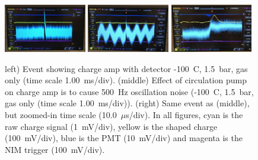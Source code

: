  \begin{figure}[htbp]
\begin{center}
\includegraphics[width = 0.32\textwidth, keepaspectratio]{figures/testbed/circ_off.png}
\includegraphics[width = 0.32\textwidth, keepaspectratio]{figures/testbed/circ_noise.png}
\includegraphics[width = 0.32\textwidth, keepaspectratio]{figures/testbed/circ_noise_zoom.png}
\caption{left) Event showing charge amp with detector -100~C, 1.5~bar, gas only (time scale 1.00~ms/div). (middle) Effect of circulation pump on charge amp is to cause 500~Hz oscillation noise (-100~C, 1.5~bar, gas only (time scale 1.00~ms/div)). (right) Same event as (middle), but zoomed-in time scale (10.0~$\mu$s/div). In all figures, cyan is the raw charge signal (1~mV/div), yellow is the shaped charge (100~mV/div), blue is the \acs{PMT} (10~mV/div) and magenta is the \acs{NIM} trigger (100~mV/div).}
\label{fig:amp_noise}
\end{center}
\end{figure}

